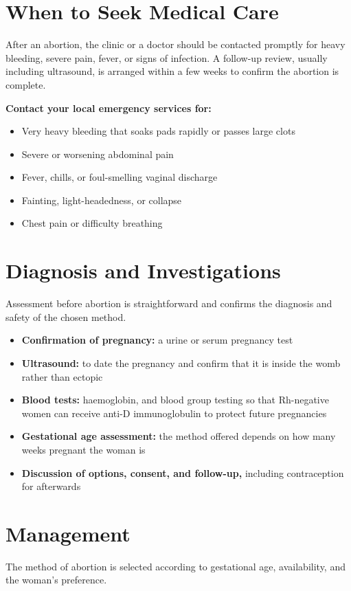 \section*{When to Seek Medical Care}
After an abortion, the clinic or a doctor should be contacted promptly for heavy bleeding, severe pain, fever, or signs of infection. A follow-up review, usually including ultrasound, is arranged within a few weeks to confirm the abortion is complete.

\textbf{Contact your local emergency services for:}
\begin{itemize}
    \item Very heavy bleeding that soaks pads rapidly or passes large clots
    \item Severe or worsening abdominal pain
    \item Fever, chills, or foul-smelling vaginal discharge
    \item Fainting, light-headedness, or collapse
    \item Chest pain or difficulty breathing
\end{itemize}

\section*{Diagnosis and Investigations}
Assessment before abortion is straightforward and confirms the diagnosis and safety of the chosen method.

\begin{itemize}
    \item \textbf{Confirmation of pregnancy:} a urine or serum pregnancy test
    \item \textbf{Ultrasound:} to date the pregnancy and confirm that it is inside the womb rather than ectopic
    \item \textbf{Blood tests:} haemoglobin, and blood group testing so that Rh-negative women can receive anti-D immunoglobulin to protect future pregnancies
    \item \textbf{Gestational age assessment:} the method offered depends on how many weeks pregnant the woman is
    \item \textbf{Discussion of options, consent, and follow-up,} including contraception for afterwards
\end{itemize}

\section*{Management}
The method of abortion is selected according to gestational age, availability, and the woman's preference.

